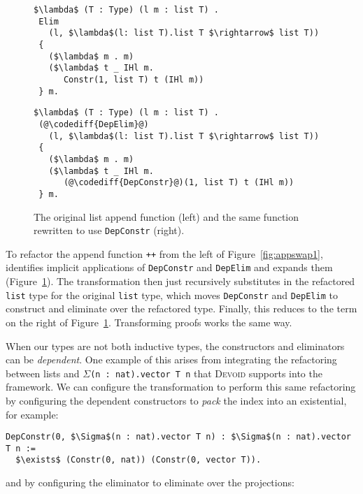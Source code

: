\begin{figure}
\begin{minipage}{0.48\textwidth}
\begin{lstlisting}
$\lambda$ (T : Type) (l m : list T) .
 Elim
   (l, $\lambda$(l: list T).list T $\rightarrow$ list T))
 {
   ($\lambda$ m . m)
   ($\lambda$ t _ IHl m.
      Constr(1, list T) t (IHl m))
 } m.
\end{lstlisting}
\end{minipage}
\hfill
\begin{minipage}{0.48\textwidth}
\begin{lstlisting}
$\lambda$ (T : Type) (l m : list T) .
 (@\codediff{DepElim}@)
   (l, $\lambda$(l: list T).list T $\rightarrow$ list T))
 {
   ($\lambda$ m . m)
   ($\lambda$ t _ IHl m.
      (@\codediff{DepConstr}@)(1, list T) t (IHl m))
 } m.
\end{lstlisting}
\end{minipage}
\caption{The original list append function (left) and the same function rewritten to use \lstinline{DepConstr} (right).}
\label{fig:appswap2}
\end{figure}

To refactor the append function \lstinline{++} from the left of Figure~\ref{fig:appswap1}, \toolname
identifies implicit applications of \lstinline{DepConstr} and \lstinline{DepElim} and expands them (Figure~\ref{fig:appswap2}).
The transformation then just recursively substitutes in the refactored \lstinline{list} type
for the original \lstinline{list} type, which moves \lstinline{DepConstr} and \lstinline{DepElim}
to construct and eliminate over the refactored type.
Finally, this reduces to the term on the right of Figure~\ref{fig:appswap2}.
Transforming proofs works the same way.

When our types are not both inductive types, the constructors and eliminators can be \textit{dependent}.
One example of this arises from integrating the refactoring between lists and $\Sigma$\lstinline{(n : nat).vector T n} that
\textsc{Devoid} supports into the \toolname framework.
We can configure the \toolname transformation to perform this same refactoring
by configuring the dependent constructors to \textit{pack} the index into an existential, for example:

\begin{lstlisting}
DepConstr(0, $\Sigma$(n : nat).vector T n) : $\Sigma$(n : nat).vector T n :=
  $\exists$ (Constr(0, nat)) (Constr(0, vector T)).
\end{lstlisting}
and by configuring the eliminator to eliminate over the projections:

